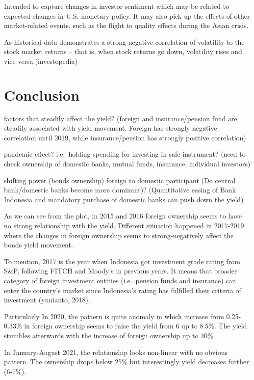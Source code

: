 \documentclass[11pt,a4paper,]{article}
\begin{document}
Intended to capture changes in investor sentiment which may be related to
expected changes in U.S. monetary policy. It may also pick up the effects of other market-related events, such as the flight to quality effects during the Asian crisis.
\textcite{arora}

As historical data demonstrates a strong negative correlation of volatility to the stock market returns -- that is, when stock returns go down, volatility rises and vice versa.(investopedia)

\hypertarget{conclusion}{%
\section{Conclusion}\label{conclusion}}

factors that steadily affect the yield? (foreign and insurance/pension fund are steadily associated with yield movement. Foreign has strongly negative correlation until 2019, while insurance/pension has strongly positive correlation)

pandemic effect? i.e.~holding spending for investing in safe instrument? (need to check ownership of domestic banks, mutual funds, insurance, individual investors)

shifting power (bonds ownership) foreign to domestic participant (Do central bank/domestic banks become more dominant)?
(Quantitative easing of Bank Indonesia and mandatory purchase of domestic banks can push down the yield)

As we can see from the plot, in 2015 and 2016 foreign ownership seems to have no strong relationship with the yield. Different situation happened in 2017-2019 where the changes in foreign ownership seems to strong-negatively affect the bonds yield movement.

To mention, 2017 is the year when Indonesia got investment grade rating from S\&P, following FITCH and Moody's in previous years. It means that broader category of foreign investment entities (i.e.~pension funds and insurance) can enter the country's market since Indonesia's rating has fulfilled their criteria of investment (yunianto, 2018).

Particularly In 2020, the pattern is quite anomaly in which increase from 0.25-0.33\% in foreign ownership seems to raise the yield from 6 up to 8.5\%. The yield stumbles afterwards with the increase of foreign ownership up to 40\%.

In January-August 2021, the relationship looks non-linear with no obvious pattern. The ownership drops below 25\% but interestingly yield decreases further (6-7\%).
\end{document}
